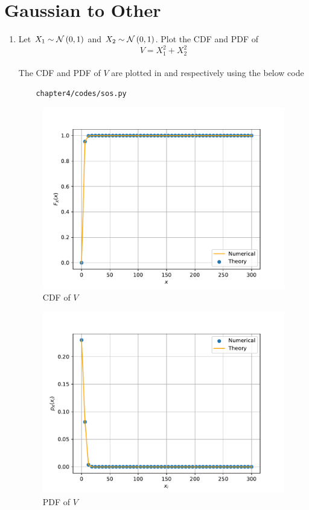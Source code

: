 \section{Gaussian to Other}
\begin{enumerate}
\item
Let $X_1 \sim  \mathcal{N}\left(0,1\right)$ and $X_2 \sim  \mathcal{N}\left(0,1\right)$. Plot the CDF and PDF of
%
\begin{equation}
V = X_1^2 + X_2^2
\end{equation}\\
\solution The CDF and PDF of $V$ are plotted in  and  respectively using the below code
\begin{lstlisting}
	chapter4/codes/sos.py
\end{lstlisting}
\begin{figure}[H]
\centering
\includegraphics[width=\columnwidth]{chapter4/figs/chisq_cdf.pdf}
\caption{CDF of $V$}
\label{fig:chisq_cdf}
\end{figure}
\begin{figure}[H]
\centering
\includegraphics[width=\columnwidth]{chapter4/figs/chisq_pdf.pdf}
\caption{PDF of $V$}
\label{fig:chisq_pdf}
\end{figure}
%


\end{enumerate}
